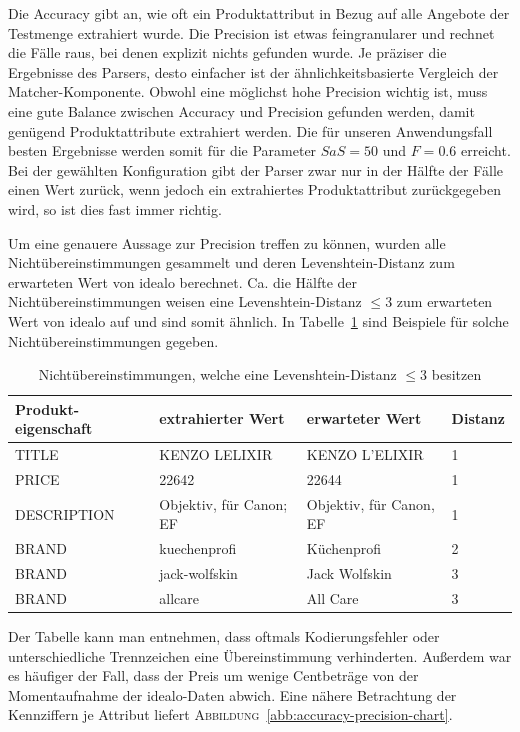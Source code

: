 Die Accuracy gibt an, wie oft ein Produktattribut in Bezug auf alle Angebote der Testmenge extrahiert wurde.
Die Precision ist etwas feingranularer und rechnet die Fälle raus, bei denen explizit nichts gefunden wurde.
Je präziser die Ergebnisse des Parsers, desto einfacher ist der ähnlichkeitsbasierte Vergleich der Matcher-Komponente.
Obwohl eine möglichst hohe Precision wichtig ist, muss eine gute Balance zwischen Accuracy und Precision gefunden
werden, damit genügend Produktattribute extrahiert werden.
Die für unseren Anwendungsfall besten Ergebnisse werden somit für die Parameter $SaS = 50$ und $F= 0.6$ erreicht.
Bei der gewählten Konfiguration gibt der Parser zwar nur in der Hälfte der Fälle einen Wert zurück, wenn jedoch ein
extrahiertes Produktattribut zurückgegeben wird, so ist dies fast immer richtig.

Um eine genauere Aussage zur Precision treffen zu können, wurden alle Nichtübereinstimmungen gesammelt und deren
Levenshtein-Distanz zum erwarteten Wert von idealo berechnet.
Ca. die Hälfte der Nichtübereinstimmungen weisen eine Levenshtein-Distanz $\leq 3$ zum erwarteten Wert von idealo
auf und sind somit ähnlich.
In Tabelle~\ref{tab:levenshtein-examples} sind Beispiele für solche Nichtübereinstimmungen gegeben.

\begin{table}[h]
    \centering
    \begin{tabular}{ p{2.75cm} | p{4.5cm} | p{4.5cm} | p{1cm}}
        \textbf{Produkt-eigenschaft} & \textbf{extrahierter Wert} & \textbf{erwarteter Wert} &
        \textbf{Distanz} \\
        \hline
        TITLE & KENZO LELIXIR & KENZO L'ELIXIR & 1\\
        PRICE & 22642 & 22644 & 1\\
        DESCRIPTION & Objektiv, für Canon; EF	& Objektiv, für Canon, EF & 1\\
        BRAND &	kuechenprofi & Küchenprofi & 2\\
        BRAND & jack-wolfskin & Jack Wolfskin & 3\\
        BRAND & allcare & All Care & 3
    \end{tabular}
    \caption{Nichtübereinstimmungen, welche eine Levenshtein-Distanz $\leq 3$ besitzen}
    \label{tab:levenshtein-examples}
    \vspace{-0.25cm}
\end{table}

Der Tabelle kann man entnehmen, dass oftmals Kodierungsfehler oder unterschiedliche Trennzeichen eine
Übereinstimmung verhinderten.
Außerdem war es häufiger der Fall, dass der Preis um wenige Centbeträge von der Momentaufnahme der idealo-Daten
abwich.
\newpage
Eine nähere Betrachtung der Kennziffern je Attribut liefert \textsc{Abbildung}~\ref{abb:accuracy-precision-chart}.

